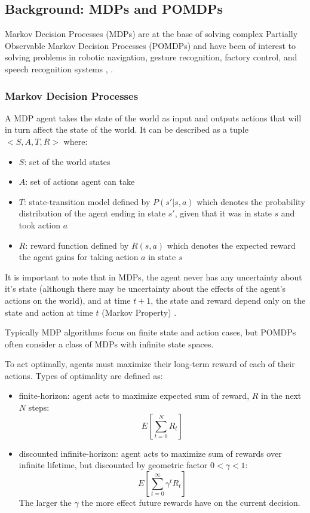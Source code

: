 \documentclass[12pt]{elsarticle}
\begin{document}
\subsection{Background: MDPs and POMDPs}
Markov Decision Processes (MDPs) are at the base of solving complex Partially Observable Markov Decision Processes (POMDPs) and have been of interest to solving problems in robotic navigation, gesture recognition, factory control, and speech recognition systems \cite{kaelbling1998planning}, \cite{porta2006point}.

\subsubsection{Markov Decision Processes}
A MDP agent takes the state of the world as input and outputs actions that will in turn affect the state of the world. It can be described as a tuple $<S,A,T,R>$ where:
\begin{itemize}
    \item $S$: set of the world states
    \item $A$: set of actions agent can take
    \item $T$: state-transition model defined by $P(s'|s,a)$ which denotes the probability distribution of the agent ending in state $s'$, given that it was in state $s$ and took action $a$
    \item $R$: reward function defined by $R(s,a)$ which denotes the expected reward the agent gains for taking action $a$ in state $s$
\end{itemize}

It is important to note that in MDPs, the agent never has any uncertainty about it's state (although there may be uncertainty about the effects of the agent's actions on the world), and at time $t+1$, the state and reward depend only on the state and action at time $t$ (Markov Property) \cite{kaelbling1998planning}.

Typically MDP algorithms focus on finite state and action cases, but POMDPs often consider a class of MDPs with infinite state spaces. 

To act optimally, agents must maximize their long-term reward of each of their actions. Types of optimality are defined as:
\begin{itemize}
    \item finite-horizon: agent acts to maximize expected sum of reward, $R$ in the next $N$ steps: \[ E[\sum_{t=0}^{N} R_t] \]
    \item discounted infinite-horizon: agent acts to maximize sum of rewards over infinite lifetime, but discounted by geometric factor $0 < \gamma < 1$:
    \[ E[\sum_{t=0}^{\infty} \gamma^t R_t] \]
    The larger the $\gamma$ the more effect future rewards have on the current decision. 
\end{itemize}
\end{document}
